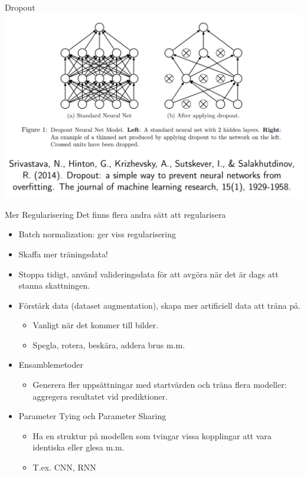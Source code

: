 \documentclass[10pt,english]{beamer}
\begin{document}
\begin{frame}{Dropout}
    \includegraphics[width=\textwidth]{figs/dropout_example.png}
\end{frame}

\begin{frame}{Mer Regularisering}
    Det finns flera andra sätt att regularisera
    \begin{itemize}
        \item Batch normalization: ger viss regularisering
        \item Skaffa mer träningsdata!
        \item Stoppa tidigt, använd valideringsdata för att avgöra när det är dags att stanna skattningen.
        \item Förstärk data (dataset augmentation), skapa mer artificiell data att träna på.
        \begin{itemize}
            \item Vanligt när det kommer till bilder.
            \item Spegla, rotera, beskära, addera brus m.m.
        \end{itemize}
        \item Ensamblemetoder
        \begin{itemize}
            \item Generera fler uppsättningar med startvärden och träna flera modeller: aggregera resultatet vid prediktioner.
        \end{itemize}
        \item Parameter Tying och Parameter Sharing
        \begin{itemize}
            \item Ha en struktur på modellen som tvingar vissa kopplingar att vara identiska eller glesa m.m.
            \item T.ex. CNN, RNN
        \end{itemize}
    \end{itemize}
\end{frame}
\end{document}
